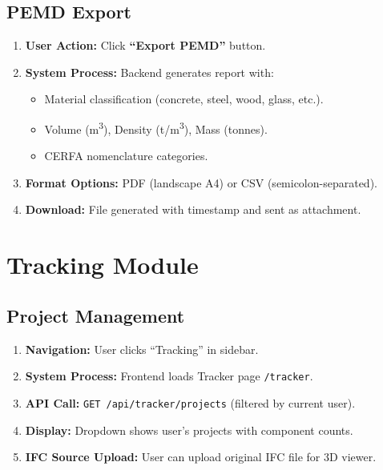 \documentclass[11pt,a4paper]{article}
\begin{document}
\subsection{PEMD Export}

\begin{enumerate}[leftmargin=*]
    \item \textbf{User Action:} Click \textbf{``Export PEMD''} button.
    \item \textbf{System Process:} Backend generates report with:
        \begin{itemize}
            \item Material classification (concrete, steel, wood, glass, etc.).
            \item Volume (m\textsuperscript{3}), Density (t/m\textsuperscript{3}), Mass (tonnes).
            \item CERFA nomenclature categories.
        \end{itemize}
    \item \textbf{Format Options:} PDF (landscape A4) or CSV (semicolon-separated).
    \item \textbf{Download:} File generated with timestamp and sent as attachment.
\end{enumerate}

\section{Tracking Module}

\subsection{Project Management}

\begin{enumerate}[leftmargin=*]
    \item \textbf{Navigation:} User clicks ``Tracking'' in sidebar.
    \item \textbf{System Process:} Frontend loads Tracker page \texttt{/tracker}.
    \item \textbf{API Call:} \texttt{GET /api/tracker/projects} (filtered by current user).
    \item \textbf{Display:} Dropdown shows user's projects with component counts.
    \item \textbf{IFC Source Upload:} User can upload original IFC file for 3D viewer.
\end{enumerate}
\end{document}
